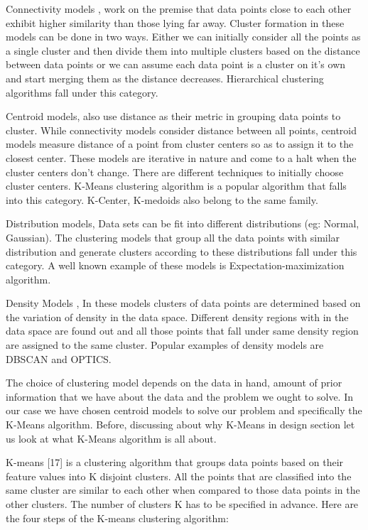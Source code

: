 Connectivity models \cite{doi:10.1093/comjnl/26.4.354}, work on the premise that data points close to each other exhibit higher similarity than those lying far away. Cluster formation in these models can be done in two ways. Either we can initially consider all the points as a single cluster and then divide them into multiple clusters based on the distance between data points or we can assume each data point is a cluster on it's own and start merging them as the distance decreases. Hierarchical clustering algorithms fall under this category.

Centroid models, also use distance as their metric in grouping data points to cluster. While connectivity models consider distance between all points, centroid models measure distance of a point from cluster centers so as to assign it to the closest center. These models are iterative in nature and come to a halt when the cluster centers don't change. There are different techniques to initially choose cluster centers.  K-Means clustering algorithm \cite{Derpanis06k-meansclustering} is a popular algorithm that falls into this category. K-Center, K-medoids also belong to the same family.
 
Distribution models\cite{Johnson2000}, Data sets can be fit into different distributions (eg: Normal, Gaussian). The clustering models that group all the data points with similar distribution and generate clusters according to these distributions fall under this category. A well known example of these models is Expectation-maximization algorithm. 

Density Models \cite{thang2011anomaly}, In these models clusters of data points are determined based on the variation of density in the data space. Different density regions with in the data space are found out and all those points that fall under same density region are assigned to the same cluster. Popular examples of density models are DBSCAN and OPTICS.

The choice of clustering model depends on the data in hand, amount of prior information that we have about the data and the problem we ought to solve. In our case we have chosen centroid models to solve our problem and specifically the K-Means algorithm. Before, discussing about why K-Means in design section let us look at what K-Means algorithm is all about.

K-means [17] is a clustering algorithm that groups data points based on their feature values into K disjoint clusters. All the points that are classified into the same cluster are similar to each other when compared to those data points in the other clusters. The number of clusters K has to be specified in advance. Here are the four steps of the K-means clustering
algorithm:

